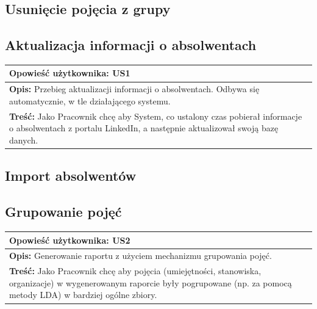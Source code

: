 \subsection{Usunięcie pojęcia z grupy}

{}
{}{}
{}
{}

\subsection{Aktualizacja informacji o absolwentach}

	\begin{tabular}{| p{} |}
		\hline
		\textbf{Opowieść użytkownika:} US1 \\
		\hline
		\textbf{Opis:} Przebieg aktualizacji informacji o absolwentach. Odbywa się automatycznie, w tle działającego systemu. \\
		\hline
		\textbf{Treść:} Jako Pracownik chcę aby System, co ustalony czas pobierał informacje o absolwentach z portalu LinkedIn, a
następnie aktualizował swoją bazę danych. \\
		\hline  
	\end{tabular}
	
\subsection{Import absolwentów}

{}
{}{}
{}
{}	

\subsection{Grupowanie pojęć}

	\begin{tabular}{| p{} |}
		\hline
		\textbf{Opowieść użytkownika:} US2 \\
		\hline
		\textbf{Opis:} Generowanie raportu z użyciem mechanizmu grupowania pojęć. \\
		\hline
		\textbf{Treść:} Jako Pracownik chcę aby pojęcia (umiejętności, stanowiska, organizacje) w wygenerowanym raporcie były
pogrupowane (np. za pomocą metody LDA) w bardziej ogólne zbiory. 
 \\
		\hline  
	\end{tabular}